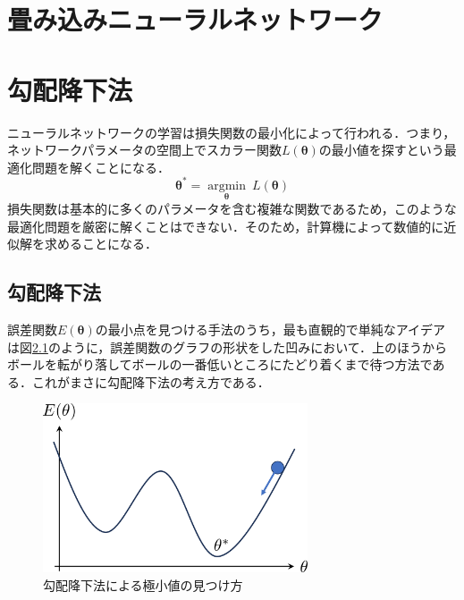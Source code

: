 \documentclass[a4paper,11pt]{jsreport}
\begin{document}
\section{畳み込みニューラルネットワーク}

\section{勾配降下法}
ニューラルネットワークの学習は損失関数の最小化によって行われる．つまり，ネットワークパラメータの空間上でスカラー関数$L(\bm{\theta})$の最小値を探すという最適化問題を解くことになる．
\begin{equation}
  \bm{\theta}^* = \underset{\bm{\theta}} {\operatorname{argmin}} \ L(\bm{\theta})
\end{equation}
損失関数は基本的に多くのパラメータを含む複雑な関数であるため，このような最適化問題を厳密に解くことはできない．そのため，計算機によって数値的に近似解を求めることになる．\par

\subsection{勾配降下法}
誤差関数$E(\bm{\theta})$の最小点を見つける手法のうち，最も直観的で単純なアイデアは図\ref{}のように，誤差関数のグラフの形状をした凹みにおいて．上のほうからボールを転がり落してボールの一番低いところにたどり着くまで待つ方法である．これがまさに勾配降下法の考え方である．\par

\begin{figure}
  \begin{center}
    \includegraphics[height=5cm]{image/gradient_decent.png}
    \caption{勾配降下法による極小値の見つけ方}
  \end{center}
\end{figure}
\end{document}
